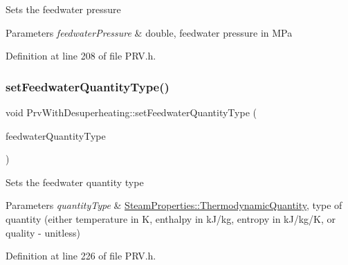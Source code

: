 Sets the feedwater pressure


\begin{DoxyParams}{Parameters}
{\em feedwater\+Pressure} & double, feedwater pressure in M\+Pa \\
\hline
\end{DoxyParams}


Definition at line 208 of file P\+R\+V.\+h.

\mbox{\label{class_prv_with_desuperheating_a3efaf028d1e6b8349a9e064605cc8d7a}} 
\subsubsection{\texorpdfstring{set\+Feedwater\+Quantity\+Type()}{setFeedwaterQuantityType()}\hspace{0.1cm}{\footnotesize\ttfamily [1/3]}}
{\footnotesize\ttfamily void Prv\+With\+Desuperheating\+::set\+Feedwater\+Quantity\+Type (\begin{DoxyParamCaption}\item[{\hyperlink{class_steam_properties_ae0294bedf7d178c2d8fb6aed0f62fbff}{Steam\+Properties\+::\+Thermodynamic\+Quantity}}]{feedwater\+Quantity\+Type }\end{DoxyParamCaption})\hspace{0.3cm}{\ttfamily [inline]}}

Sets the feedwater quantity type


\begin{DoxyParams}{Parameters}
{\em quantity\+Type} & \hyperlink{class_steam_properties_ae0294bedf7d178c2d8fb6aed0f62fbff}{Steam\+Properties\+::\+Thermodynamic\+Quantity}, type of quantity (either temperature in K, enthalpy in k\+J/kg, entropy in k\+J/kg/K, or quality -\/ unitless) \\
\hline
\end{DoxyParams}


Definition at line 226 of file P\+R\+V.\+h.

\mbox{\label{class_prv_with_desuperheating_a3efaf028d1e6b8349a9e064605cc8d7a}} 
